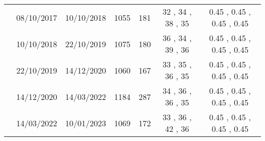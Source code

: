 \documentclass{article}
\begin{document}
\begin{table}[htbp]
{\begin{adjustwidth}{0in}{0in}
\begin{tabular}{ccccccc}
				& 08/10/2017                      & 10/10/2018                    & 1055                       & 181                       & 32                          , 34                          , 38                          , 35                          & 0.45                        , 0.45                        , 0.45                        , 0.45                        \\
				& 10/10/2018                      & 22/10/2019                    & 1075                       & 180                       & 36                          , 34                          , 39                          , 36                          & 0.45                        , 0.45                        , 0.45                        , 0.45                        \\
				& 22/10/2019                      & 14/12/2020                    & 1060                       & 167                       & 33                          , 35                          , 36                          , 35                          & 0.45                        , 0.45                        , 0.45                        , 0.45                        \\
				& 14/12/2020                      & 14/03/2022                    & 1184                       & 287                       & 34                          , 36                          , 36                          , 35                          & 0.45                        , 0.45                        , 0.45                        , 0.45                        \\
				& 14/03/2022                      & 10/01/2023                    & 1069                       & 172                       & 33                          , 36                          , 42                          , 36                          & 0.45                        , 0.45                        , 0.45                        , 0.45                       
				\\ 
				\bottomrule
			\end{tabular}
		\end{adjustwidth}
	}
	
	
\end{table}
\restoregeometry

\newpage
\end{document}
